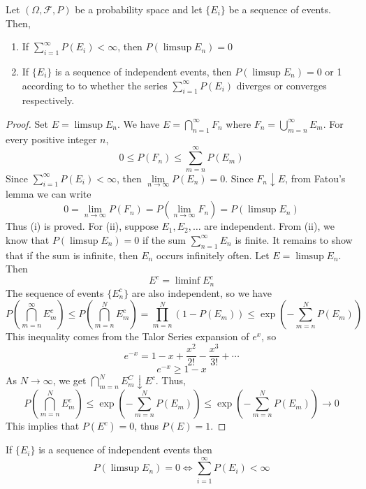 \noindent

\begin{lemma}
    Let $(\Omega, \mathcal{F}, P)$ be a probability space and let $\{E_i\}$ be a sequence of events. Then,
    \begin{enumerate}[label=(\roman*)]
        \item If $\sum\limits_{i=1}^\infty P(E_i) < \infty$, then $P(\limsup E_n )= 0$
        \item If $\{E_i\}$ is a sequence of independent events, then $P(\limsup E_n) = 0$ or 1 according to to whether the series $\sum\limits_{i=1}^\infty P(E_i)$ diverges or converges respectively.
    \end{enumerate}
\end{lemma}
\begin{proof}
    Set $E = \limsup E_n$. We have $E = \bigcap\limits_{n=1}^\infty F_n$ where $F_n = \bigcup\limits_{m=n}^\infty E_m$. For every positive integer $n$, 
    \[0 \leq P(F_n) \leq \sum_{m=n}^\infty P(E_m)\]
    Since $\sum\limits_{i=1}^\infty P(E_i) < \infty$, then $\lim\limits_{n\rightarrow \infty} P(E_n) = 0$. Since $F_n \downarrow E$, from Fatou's lemma we can write 
    \[0 = \lim_{n\rightarrow \infty} P(F_n) = P \left(\lim_{n\rightarrow\infty} F_n\right) = P(\limsup E_n)\]
    Thus (i) is proved. For (ii), suppose $E_1, E_2, \ldots$ are independent. From (ii), we know that $P(\limsup E_n) = 0$  if the sum $\sum_{n=1}^\infty E_n$ is finite. It remains to show that if the sum is infinite, then $E_n$ occurs infinitely often. Let $E = \limsup E_n$. Then 
    \[E^c = \liminf E_n^c\]
    The sequence of events $\{E_n^c\}$ are also independent, so we have 
    \[P\left(\bigcap_{m=n}^\infty E_m^c\right) \leq P\left(\bigcap_{m=n}^N E_m^c\right) = \prod_{m=n}^N (1 - P(E_m)) \leq \exp \left(- \sum_{m=n}^N P(E_m)\right)\]
    This inequality comes from the Talor Series expansion of $e^x$, so
    \[e^{-x} = 1 - x + \frac{x^2}{2!} - \frac{x^3}{3!} + \cdots\] 
    \[e^{-x} \geq 1 - x\]
    As $N \rightarrow \infty$, we get $\bigcap\limits_{m=n}^N E_{m}^C \downarrow E^c$. Thus, 
    \[P\left(\bigcap_{m=n}^N E_m^c\right) \leq \exp\left(-\sum_{m=n}^N P(E_m)\right) \leq \exp \left(-\sum_{m=n}^N P(E_m)\right) \rightarrow 0\]
    This implies that $P(E^c) = 0$, thus $P(E) = 1$.
 \end{proof}
 \begin{corollary}
    If $\{E_i\}$ is a sequence of independent events then 
    \[P(\limsup E_n) =  0 \iff \sum_{i=1}^{\infty} P(E_i) < \infty\]
\end{corollary}
